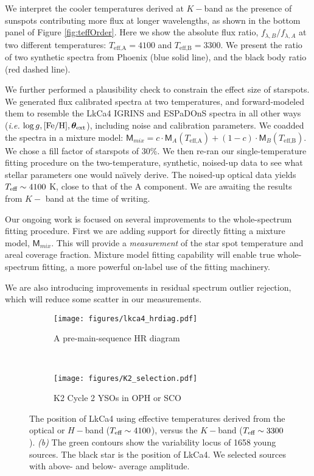 \documentclass[11pt,aas_macros]{article}
\begin{document}
We interpret the cooler temperatures derived at $K-$band as the presence of sunspots contributing more flux at longer wavelengths, as shown in the bottom panel of Figure \ref{fig:teffOrder}.  Here we show the absolute flux ratio, $f_{\lambda, B} / f_{\lambda, A}$ at two different temperatures: $T_\textrm{eff,A} = 4100$ and $T_\textrm{eff,B} = 3300$.  We present the ratio of two synthetic spectra from Phoenix (blue solid line), and the black body ratio (red dashed line).  

We further performed a plausibility check to constrain the effect size of starspots.  We generated flux calibrated spectra at two temperatures, and forward-modeled them to resemble the LkCa4 IGRINS and ESPaDOnS spectra in all other ways (\emph{i.e.} $\log g, [{\rm Fe}/{\rm H}], {\bm \theta}_{\rm ext}$), including noise and calibration parameters.  We coadded the spectra in a mixture model:  $ \mathsf{M}_{mix} = c \cdot \mathsf{M}_A(T_\textrm{eff,A}) + (1-c) \cdot \mathsf{M}_B(T_\textrm{eff,B})$.  We chose a fill factor of starspots of 30\%.  We then re-ran our single-temperature fitting procedure on the two-temperature, synthetic, noised-up data to see what stellar parameters one would na\"{\i}vely derive.  The noised-up optical data yields $T_\textrm{eff} \sim 4100$ K, close to that of the A component.  We are awaiting the results from $K-$ band at the time of writing.

Our ongoing work is focused on several improvements to the whole-spectrum fitting procedure.  First we are adding support for directly fitting a mixture model, $\mathsf{M}_{mix}$.  This will provide a \emph{measurement} of the star spot temperature and areal coverage fraction.  Mixture model fitting capability will enable true whole-spectrum fitting, a more powerful on-label use of the fitting machinery.

We are also introducing improvements in residual spectrum outlier rejection, which will reduce some scatter in our measurements.

\begin{figure}[b]
    \centering
    \begin{subfigure}[b]{0.48\textwidth}
        \texttt{[image: figures/lkca4\_hrdiag.pdf]}
        \caption{A pre-main-sequence HR diagram}
        \label{fig:gull}
    \end{subfigure}
    ~ %
    \begin{subfigure}[b]{0.48\textwidth}
        \texttt{[image: figures/K2\_selection.pdf]} 
        \caption{K2 Cycle 2 YSOs in OPH or SCO}
        \label{fig:tiger}
    \end{subfigure}
    \caption{The position of LkCa4 using effective temperatures derived from the optical or $H-$band ($T_\textrm{eff}\sim4100$), versus the $K-$band ($T_\textrm{eff} \sim 3300$). \emph{(b)} The green contours show the variability locus of 1658 young sources.  The black star is the position of LkCa4.  We selected sources with above- and below- average amplitude.} \label{fig:science}
\end{figure}
\end{document}
